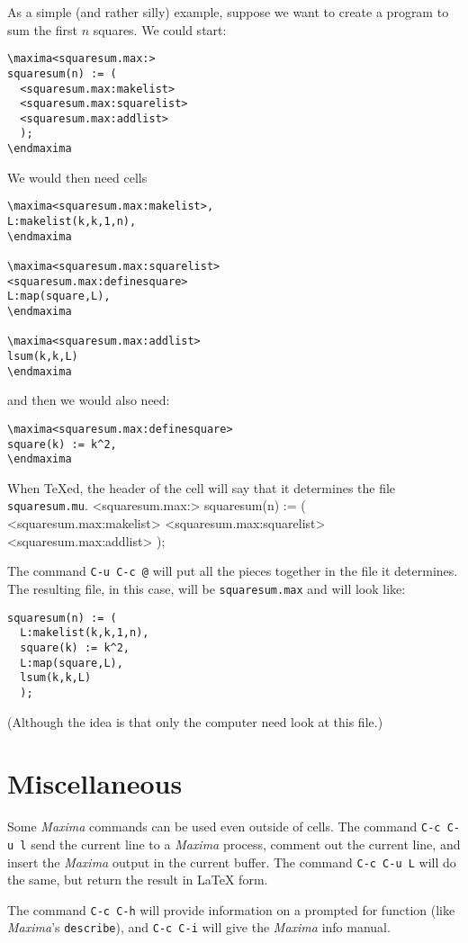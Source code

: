 \documentclass{article}
\newcommand{\mx}{\textsl{\sffamily Maxima}}
\begin{document}
As a simple (and rather silly) example, suppose we want to create a
program to sum the first $n$ squares.  We could start:
\begin{verbatim}
\maxima<squaresum.max:>
squaresum(n) := (
  <squaresum.max:makelist>
  <squaresum.max:squarelist>
  <squaresum.max:addlist>
  );        
\endmaxima
\end{verbatim}
\noindent
We would then need cells
\begin{verbatim}
\maxima<squaresum.max:makelist>,
L:makelist(k,k,1,n),
\endmaxima

\maxima<squaresum.max:squarelist>
<squaresum.max:definesquare>
L:map(square,L),
\endmaxima

\maxima<squaresum.max:addlist>
lsum(k,k,L)
\endmaxima
\end{verbatim}
\noindent
and then we would also need:
\begin{verbatim}
\maxima<squaresum.max:definesquare>
square(k) := k^2,
\endmaxima
\end{verbatim}
\noindent
When \TeX{}ed, the header of the cell will say that it determines the
file \texttt{squaresum.mu}.  
\maxima<squaresum.max:>
squaresum(n) := (
  <squaresum.max:makelist>
  <squaresum.max:squarelist>
  <squaresum.max:addlist>
  );        
\endmaxima

The command 
\texttt{C-u C-c @} will put all the pieces
together in the file it determines.  The resulting file, in this case,
will be \texttt{squaresum.max} and will look like:
\begin{verbatim}
squaresum(n) := (
  L:makelist(k,k,1,n),
  square(k) := k^2,
  L:map(square,L),
  lsum(k,k,L)
  );        
\end{verbatim}
\noindent
(Although the idea is that only the computer need look at this file.)

\section{Miscellaneous}

\noindent
Some \mx{} commands can be used even outside of cells.  The command 
\texttt{C-c C-u l} send the current line to a
\mx{} process, comment out the current line, and insert the \mx{}
output in the current buffer.  The command 
\texttt{C-c C-u L} will do the same, but
return the result in \LaTeX{} form.

The command \texttt{C-c C-h} will provide
information on a prompted for function (like \mx's \texttt{describe}), 
and  \texttt{C-c C-i} will give the \mx{} info manual.
\end{document}
